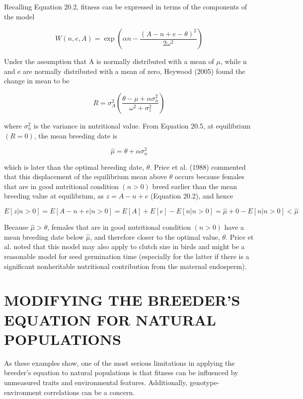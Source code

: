 \documentclass{article}
\begin{document}
Recalling Equation 20.2, fitness can be expressed in terms of the components of the model

\begin{equation}
W(n,e,A)=\exp\left(\alpha n-\frac{(A-n+e-\theta)^{2}}{2\omega^{2}}\right)
\tag{20.4b}
\label{eq:20_4b}
\end{equation}

Under the assumption that A is normally distributed with a mean of  $ \mu $, while n and e are normally distributed with a mean of zero, Heywood (2005) found the change in mean to be

\begin{equation}
R=\sigma_{A}^{2}\left(\frac{\theta-\mu+\alpha\sigma_{n}^{2}}{\omega^{2}+\sigma_{z}^{2}}\right)
\tag{20.5}
\label{eq:20_5}
\end{equation}

where  $ \sigma_{n}^{2} $ is the variance in nutritional value. From Equation 20.5, at equilibrium  $ (R = 0) $, the mean breeding date is

\begin{equation}
\widehat{\mu}=\theta+\alpha\sigma_{n}^{2}
\tag{20.6}
\label{eq:20_6}
\end{equation}

which is later than the optimal breeding date,  $ \theta $. Price et al. (1988) commented that this displacement of the equilibrium mean above  $ \theta $ occurs because females that are in good nutritional condition  $ (n > 0) $ breed earlier than the mean breeding value at equilibrium, as  $ z = A - n + e $ (Equation 20.2), and hence

\begin{equation}
E[z|n>0]=E[A-n+e|n>0]=E[A]+E[e]-E[n|n>0]=\widehat{\mu}+0-E[n|n>0]<\widehat{\mu}
\end{equation}

Because  $ \widehat{\mu} > \theta $, females that are in good nutritional condition  $ (n > 0) $ have a mean breeding date below  $ \widehat{\mu} $, and therefore closer to the optimal value,  $ \theta $. Price et al. noted that this model may also apply to clutch size in birds and might be a reasonable model for seed germination time (especially for the latter if there is a significant nonheritable nutritional contribution from the maternal endosperm).

\section{MODIFYING THE BREEDER'S EQUATION FOR NATURAL POPULATIONS}
As these examples show, one of the most serious limitations in applying the breeder's equation to natural populations is that fitness can be influenced by unmeasured traits and environmental features. Additionally, genotype-environment correlations can be a concern.
\end{document}
